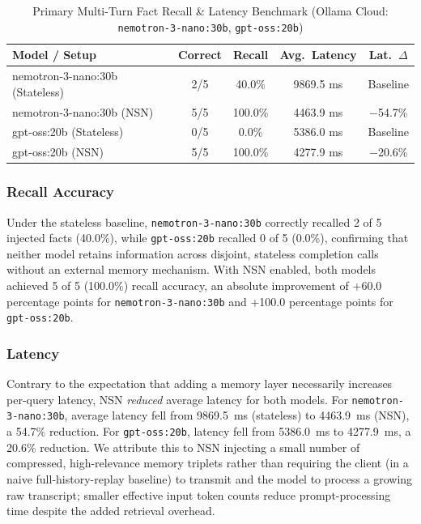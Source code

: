 \documentclass[conference]{IEEEtran}
\begin{document}
\begin{table}[t]
\caption{Primary Multi-Turn Fact Recall \& Latency Benchmark (Ollama Cloud: \texttt{nemotron-3-nano:30b}, \texttt{gpt-oss:20b})}
\label{tab:results}
\centering
\footnotesize
\begin{tabular}{@{}lcccc@{}}
\toprule
\textbf{Model / Setup} & \textbf{Correct} & \textbf{Recall} & \textbf{Avg.\ Latency} & \textbf{Lat.\ $\Delta$} \\
\midrule
nemotron-3-nano:30b (Stateless) & 2/5 & 40.0\% & 9869.5 ms & Baseline \\
nemotron-3-nano:30b (NSN)       & 5/5 & 100.0\% & 4463.9 ms & $-$54.7\% \\
\midrule
gpt-oss:20b (Stateless)         & 0/5 & 0.0\% & 5386.0 ms & Baseline \\
gpt-oss:20b (NSN)               & 5/5 & 100.0\% & 4277.9 ms & $-$20.6\% \\
\bottomrule
\end{tabular}
\end{table}

\subsubsection{Recall Accuracy}
Under the stateless baseline, \texttt{nemotron-3-nano:30b} correctly recalled 2 of 5 injected facts (40.0\%), while \texttt{gpt-oss:20b} recalled 0 of 5 (0.0\%), confirming that neither model retains information across disjoint, stateless completion calls without an external memory mechanism. With NSN enabled, both models achieved 5 of 5 (100.0\%) recall accuracy, an absolute improvement of +60.0 percentage points for \texttt{nemotron-3-nano:30b} and +100.0 percentage points for \texttt{gpt-oss:20b}.

\subsubsection{Latency}
Contrary to the expectation that adding a memory layer necessarily increases per-query latency, NSN \emph{reduced} average latency for both models. For \texttt{nemotron-3-nano:30b}, average latency fell from 9869.5~ms (stateless) to 4463.9~ms (NSN), a 54.7\% reduction. For \texttt{gpt-oss:20b}, latency fell from 5386.0~ms to 4277.9~ms, a 20.6\% reduction. We attribute this to NSN injecting a small number of compressed, high-relevance memory triplets rather than requiring the client (in a naive full-history-replay baseline) to transmit and the model to process a growing raw transcript; smaller effective input token counts reduce prompt-processing time despite the added retrieval overhead.
\end{document}
